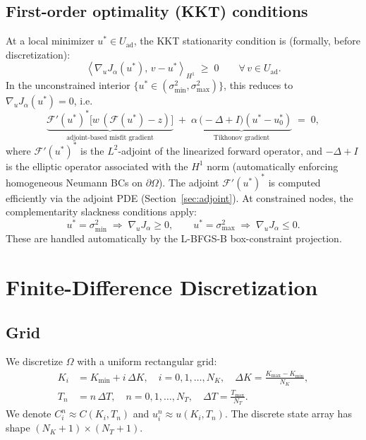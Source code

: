 \documentclass[11pt, a4paper]{article}
\newcommand{\dK}{\Delta K}
\newcommand{\dT}{\Delta T}
\newcommand{\inner}[2]{\left\langle #1,\, #2 \right\rangle}
\newcommand{\Fop}{\mathcal{F}}          %
\newcommand{\Omg}{\Omega}
\theoremstyle{definition}
\theoremstyle{plain}
\begin{document}
\subsection{First-order optimality (KKT) conditions}

At a local minimizer $u^* \in U_\text{ad}$, the KKT stationarity condition
is (formally, before discretization):
\begin{equation}\label{eq:kkt}
  \inner{\nabla_{u} J_\alpha(u^*)}{v - u^*}_{H^1}
  \;\geq\; 0
  \qquad \forall\, v \in U_\text{ad}.
\end{equation}
In the unconstrained interior $\{u^* \in (\sigma_{\min}^2, \sigma_{\max}^2)\}$,
this reduces to $\nabla_{u} J_\alpha(u^*) = 0$, i.e.\
\begin{equation}\label{eq:kkt_free}
  \underbrace{\Fop'(u^*)^* \bigl[w\,(\Fop(u^*) - z)\bigr]}_{\text{adjoint-based misfit gradient}}
  \;+\;
  \underbrace{\alpha\,\bigl(-\Delta + I\bigr)(u^* - u_0^*)}_{\text{Tikhonov gradient}}
  \;=\; 0,
\end{equation}
where $\Fop'(u^*)^*$ is the $L^2$-adjoint of the linearized forward
operator, and $-\Delta + I$ is the elliptic operator associated with the
$H^1$ norm (automatically enforcing homogeneous Neumann BCs on $\partial\Omg$).
The adjoint $\Fop'(u^*)^*$ is computed efficiently via the adjoint PDE
(Section~\ref{sec:adjoint}).  At constrained nodes, the complementarity
slackness conditions apply:
\[
  u^* = \sigma_{\min}^2 \;\Rightarrow\; \nabla_u J_\alpha \geq 0, \qquad
  u^* = \sigma_{\max}^2 \;\Rightarrow\; \nabla_u J_\alpha \leq 0.
\]
These are handled automatically by the L-BFGS-B box-constraint projection.

\section{Finite-Difference Discretization}

\subsection{Grid}

We discretize $\Omg$ with a uniform rectangular grid:
\begin{align*}
  K_i &= K_{\min} + i\,\dK, \quad i = 0, 1, \ldots, N_K, \quad
    \dK = \frac{K_{\max} - K_{\min}}{N_K}, \\
  T_n &= n\,\dT, \quad n = 0, 1, \ldots, N_T, \quad
    \dT = \frac{T_{\max}}{N_T}.
\end{align*}
We denote $C_i^n \approx C(K_i, T_n)$ and $u_i^n \approx u(K_i, T_n)$.
The discrete state array has shape $(N_K+1) \times (N_T+1)$.
\end{document}
